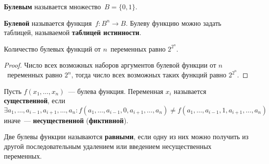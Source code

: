  \textbf{Булевым} называется множество~$B = \{ 0, 1 \}$.

 \textbf{Булевой} называется функция~$f \colon B^n \to B$.
Булеву функцию можно задать таблицей, называемой \textbf{таблицей истинности}.

\begin{statement}
Количество булевых функций от $n$~переменных равно $2^{2^n}$.
\end{statement}
\begin{proof}
Число всех возможных наборов аргументов булевой функции от $n$~переменных равно $2^n$, тогда число всех возможных таких функций равно $2^{2^n}$.
\end{proof}

  Пусть $f(x_1, \ldots, x_n)$~--- булева функция.
Переменная $x_i$ называется \textbf{существенной}, если
\begin{equation*}
\exists a_1, \ldots, a_{i-1}, a_{i+1}, \ldots, a_n \colon
f(a_1, \ldots, a_{i-1}, 0, a_{i+1}, \ldots, a_n) \neq f(a_1, \ldots, a_{i-1}, 1, a_{i+1}, \ldots, a_n)
\end{equation*}
иначе~--- \textbf{несущественной} (\textbf{фиктивной}).

Две булевы функции называются \textbf{равными}, если одну из них можно получить из другой последовательным удалением или введением несущественных переменных.
